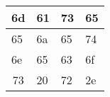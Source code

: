 \begin{tabular}{|l|l|l|l|}
  \hline
  6d & 61 & 73 & 65 \\ \hline
  65 & 6a & 65 & 74 \\ \hline
  6e & 65 & 63 & 6f \\ \hline
  \multicolumn{1}{|c|}{73} & 20 & 72 & 2e \\ \hline
\end{tabular}
